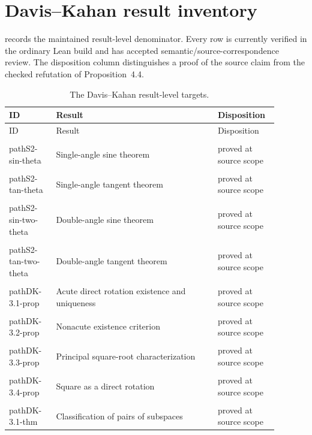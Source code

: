 \section{Davis--Kahan result inventory}
\label{app:dk-inventory}

 records the maintained result-level denominator.
Every row is currently verified in the ordinary Lean build and has accepted
semantic/source-correspondence review. The disposition column distinguishes a
proof of the source claim from the checked refutation of Proposition~4.4.

\begin{longtable}{>{\raggedright\arraybackslash}p{0.16\linewidth}>{\raggedright\arraybackslash}p{0.55\linewidth}>{\raggedright\arraybackslash}p{0.18\linewidth}}
\caption{The \DKResultCount{} Davis--Kahan result-level targets.}
\label{tab:dk-full-inventory}\\
\toprule
ID & Result & Disposition \\
\midrule
\endfirsthead
\toprule
ID & Result & Disposition \\
\midrule
\endhead
\\path{S2-sin-theta} & Single-angle sine theorem & proved at source scope \\
\\path{S2-tan-theta} & Single-angle tangent theorem & proved at source scope \\
\\path{S2-sin-two-theta} & Double-angle sine theorem & proved at source scope \\
\\path{S2-tan-two-theta} & Double-angle tangent theorem & proved at source scope \\
\\path{DK-3.1-prop} & Acute direct rotation existence and uniqueness & proved at source scope \\
\\path{DK-3.2-prop} & Nonacute existence criterion & proved at source scope \\
\\path{DK-3.3-prop} & Principal square-root characterization & proved at source scope \\
\\path{DK-3.4-prop} & Square as a direct rotation & proved at source scope \\
\\path{DK-3.1-thm} & Classification of pairs of subspaces & proved at source scope \\

\end{longtable}
